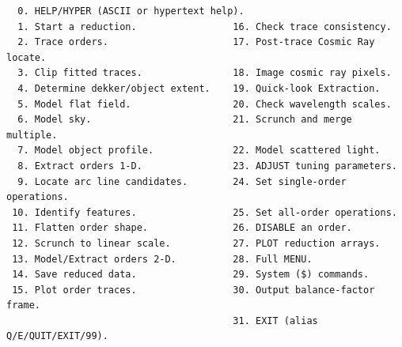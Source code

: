 \documentclass[twoside,11pt]{article}
\newenvironment{latexonly}{}{}
\begin{document}
\begin{latexonly}
\begin{verbatim}
  0. HELP/HYPER (ASCII or hypertext help).
  1. Start a reduction.                 16. Check trace consistency.
  2. Trace orders.                      17. Post-trace Cosmic Ray locate.
  3. Clip fitted traces.                18. Image cosmic ray pixels.
  4. Determine dekker/object extent.    19. Quick-look Extraction.
  5. Model flat field.                  20. Check wavelength scales.
  6. Model sky.                         21. Scrunch and merge multiple.
  7. Model object profile.              22. Model scattered light.
  8. Extract orders 1-D.                23. ADJUST tuning parameters.
  9. Locate arc line candidates.        24. Set single-order operations.
 10. Identify features.                 25. Set all-order operations.
 11. Flatten order shape.               26. DISABLE an order.
 12. Scrunch to linear scale.           27. PLOT reduction arrays.
 13. Model/Extract orders 2-D.          28. Full MENU.
 14. Save reduced data.                 29. System ($) commands.
 15. Plot order traces.                 30. Output balance-factor frame.
                                        31. EXIT (alias Q/E/QUIT/EXIT/99).
\end{verbatim}
\end{latexonly}
\end{document}
